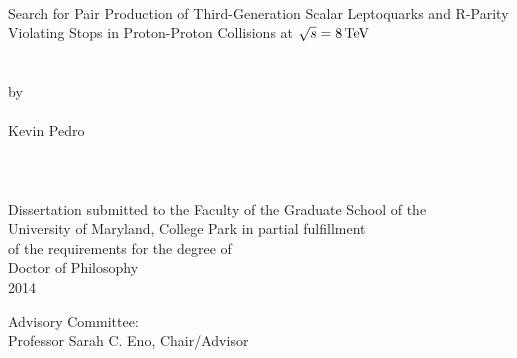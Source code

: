 
\thispagestyle{empty}
\hbox{\ }
\vspace{1in}
\renewcommand{\baselinestretch}{1}
\small\normalsize
\begin{center}

\large{Search for Pair Production of Third-Generation Scalar Leptoquarks and R-Parity Violating Stops in Proton-Proton Collisions at $\sqrt{s} = 8\,\text{Te\hspace{-.08em}V}$}\\
\ \\
\ \\
\large{by} \\
\ \\
\large{Kevin Pedro}%
\ \\
\ \\
\ \\
\ \\
\normalsize
Dissertation submitted to the Faculty of the Graduate School of the \\
University of Maryland, College Park in partial fulfillment \\
of the requirements for the degree of \\
Doctor of Philosophy \\
2014
\end{center}

\vspace{7.5em}

\noindent Advisory Committee: \\
Professor Sarah C. Eno, Chair/Advisor \\
